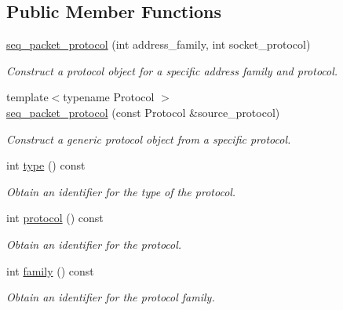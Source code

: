 \subsection*{Public Member Functions}
\begin{DoxyCompactItemize}
\item 
\hyperlink{classasio_1_1generic_1_1seq__packet__protocol_afedfbddd438642e3cdfd7ce2cf0fa5fe}{seq\+\_\+packet\+\_\+protocol} (int address\+\_\+family, int socket\+\_\+protocol)
\begin{DoxyCompactList}\small\item\em Construct a protocol object for a specific address family and protocol. \end{DoxyCompactList}\item 
{\footnotesize template$<$typename Protocol $>$ }\\\hyperlink{classasio_1_1generic_1_1seq__packet__protocol_a3ea9483303e6db5c662424ffe2fe35e0}{seq\+\_\+packet\+\_\+protocol} (const Protocol \&source\+\_\+protocol)
\begin{DoxyCompactList}\small\item\em Construct a generic protocol object from a specific protocol. \end{DoxyCompactList}\item 
int \hyperlink{classasio_1_1generic_1_1seq__packet__protocol_a13da0a16d199ffda541035c8d9e02f86}{type} () const 
\begin{DoxyCompactList}\small\item\em Obtain an identifier for the type of the protocol. \end{DoxyCompactList}\item 
int \hyperlink{classasio_1_1generic_1_1seq__packet__protocol_adb5409652d80d5a0a25861fead5c6535}{protocol} () const 
\begin{DoxyCompactList}\small\item\em Obtain an identifier for the protocol. \end{DoxyCompactList}\item 
int \hyperlink{classasio_1_1generic_1_1seq__packet__protocol_ad04b3488d1f57d770a747e3b81b1bc6d}{family} () const 
\begin{DoxyCompactList}\small\item\em Obtain an identifier for the protocol family. \end{DoxyCompactList}\end{DoxyCompactItemize}
